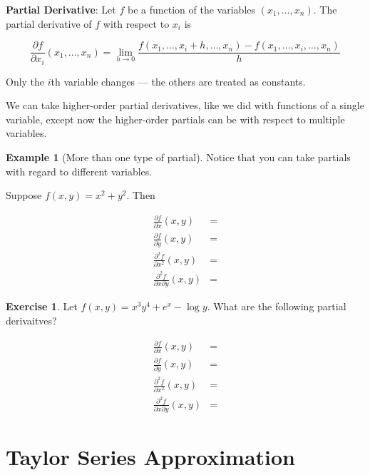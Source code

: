 \documentclass[
]{book}
\theoremstyle{definition}
\theoremstyle{definition}
\newtheorem{example}{Example}[chapter]
\theoremstyle{definition}
\newtheorem{exercise}{Exercise}[chapter]
\theoremstyle{definition}
\theoremstyle{remark}
\begin{document}
\textbf{Partial Derivative}: Let \(f\) be a function of the variables \((x_1,\ldots,x_n)\). The partial derivative of \(f\) with respect to \(x_i\) is

\[\frac{\partial f}{\partial x_i} (x_1,\ldots,x_n) = \lim\limits_{h\to 0} \frac{f(x_1,\ldots,x_i+h,\ldots,x_n)-f(x_1,\ldots,x_i,\ldots,x_n)}{h}\]

Only the \(i\)th variable changes --- the others are treated as constants.

We can take higher-order partial derivatives, like we did with functions of a single variable, except now the higher-order partials can be with respect to multiple variables.

\begin{example}[More than one type of partial]
\protect\hypertarget{exm:unnamed-chunk-205}{}{\label{exm:unnamed-chunk-205} {} }Notice that you can take partials with regard to different variables.

Suppose \(f(x,y)=x^2+y^2\). Then

\begin{align*}
\frac{\partial f}{\partial x}(x,y) &=\\
\frac{\partial f}{\partial y}(x,y) &=\\
\frac{\partial^2 f}{\partial x^2}(x,y) &=\\
\frac{\partial^2 f}{\partial x \partial y}(x,y) &=
\end{align*}
\end{example}

\begin{exercise}
\protect\hypertarget{exr:unnamed-chunk-206}{}{\label{exr:unnamed-chunk-206} }Let \(f(x,y)=x^3 y^4 +e^x -\log y\). What are the following partial derivaitves?

\begin{align*}
\frac{\partial f}{\partial x}(x,y) &=\\
\frac{\partial f}{\partial y}(x,y) &=\\
\frac{\partial^2 f}{\partial x^2}(x,y) &=\\
\frac{\partial^2 f}{\partial x \partial y}(x,y) &= 
\end{align*}
\end{exercise}

\hypertarget{taylorapprox}{%
\section{Taylor Series Approximation}\label{taylorapprox}}
\end{document}

